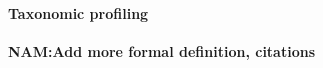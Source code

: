 \paragraph{Taxonomic profiling}\label{back:taxonomic_profiling}
\textbf{NAM:Add more formal definition, citations}


% 
